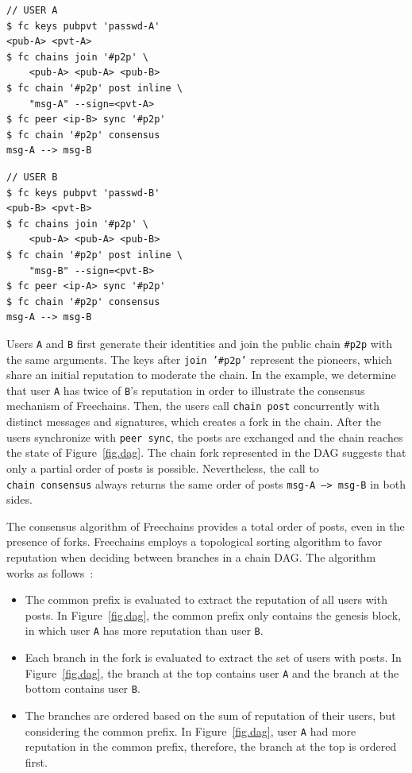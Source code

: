 \documentclass[12pt]{article}
\newcommand{\code}[1]  {\texttt{\footnotesize{#1}}}
\begin{document}
\noindent
{\footnotesize
\begin{minipage}[t]{0.5\textwidth}
\begin{verbatim}
// USER A
$ fc keys pubpvt 'passwd-A'
<pub-A> <pvt-A>
$ fc chains join '#p2p' \
    <pub-A> <pub-A> <pub-B>
$ fc chain '#p2p' post inline \
    "msg-A" --sign=<pvt-A>
$ fc peer <ip-B> sync '#p2p'
$ fc chain '#p2p' consensus
msg-A --> msg-B
\end{verbatim}
\end{minipage}
\begin{minipage}[t]{0.5\textwidth}
\begin{verbatim}
// USER B
$ fc keys pubpvt 'passwd-B'
<pub-B> <pvt-B>
$ fc chains join '#p2p' \
    <pub-A> <pub-A> <pub-B>
$ fc chain '#p2p' post inline \
    "msg-B" --sign=<pvt-B>
$ fc peer <ip-A> sync '#p2p'
$ fc chain '#p2p' consensus
msg-A --> msg-B
\end{verbatim}
\end{minipage}
}

Users \code{A} and \code{B} first generate their identities and join the
public chain \code{\#p2p} with the same arguments.
The keys after \code{join~'\#p2p'} represent the pioneers, which share an
initial reputation to moderate the chain.
In the example, we determine that user \code{A} has twice of \code{B}'s
reputation in order to illustrate the consensus mechanism of Freechains.
Then, the users call \code{chain~post} concurrently with distinct messages and
signatures, which creates a fork in the chain.
%
After the users synchronize with \code{peer~sync}, the posts are exchanged and
the chain reaches the state of Figure~\ref{fig.dag}.
The chain fork represented in the DAG suggests that only a partial order of
posts is possible.
Nevertheless, the call to \code{chain~consensus} always returns the same order
of posts \code{msg-A~-->~msg-B} in both sides.

The consensus algorithm of Freechains provides a total order of posts, even in
the presence of forks.
Freechains employs a topological sorting algorithm to favor reputation when
deciding between branches in a chain DAG.
The algorithm works as follows~\cite{fcs.sbseg20}:
\begin{itemize}
\item
    The common prefix is evaluated to extract the reputation of all users with
    posts.
    In Figure~\ref{fig.dag}, the common prefix only contains the genesis
    block, in which user \code{A} has more reputation than user \code{B}.
\item
    Each branch in the fork is evaluated to extract the set of users with
    posts.
    In Figure~\ref{fig.dag}, the branch at the top contains user \code{A} and
    the branch at the bottom contains user \code{B}.
\item
    The branches are ordered based on the sum of reputation of their users, but
    considering the common prefix.
    In Figure~\ref{fig.dag}, user \code{A} had more reputation in the common
    prefix, therefore, the branch at the top is ordered first.
\end{itemize}
\end{document}
